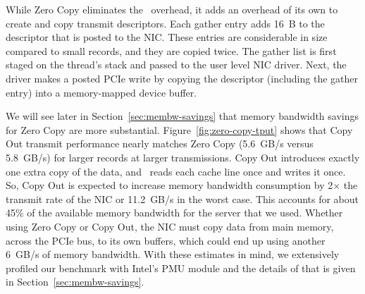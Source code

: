 While Zero Copy eliminates the \memcpy ~overhead, it adds an overhead of its own to create and copy transmit descriptors.
Each gather entry adds 16~B to the descriptor that is posted to the NIC.
These entries are considerable in size compared to
small records, and they are copied twice. The gather list
is first staged on the thread's stack and passed to the user level NIC driver. Next,
the driver makes a posted PCIe write by copying the descriptor (including the
gather entry) into a memory-mapped device buffer.

We will see later in Section~\ref{sec:membw-savings} that memory bandwidth savings for Zero Copy are more substantial.
Figure~\ref{fig:zero-copy-tput} shows that Copy Out transmit performance nearly
matches Zero Copy (5.6~GB/s versus 5.8~GB/s) for larger records at larger transmissions. Copy Out introduces exactly one
extra copy of the data, and \memcpy~reads each cache line once and writes it
once. So, Copy Out is expected to increase memory bandwidth consumption
by 2$\times$ the transmit rate of the NIC or 11.2~GB/s in the worst case. This
accounts for about 45\% of the available memory bandwidth for the server that we used. Whether
using Zero Copy or Copy Out, the NIC must copy data from main memory, across the PCIe bus, to its own buffers, which
could end up using another 6~GB/s of memory bandwidth. With these estimates in mind, we extensively profiled
 our benchmark with Intel's PMU module and the details of that is given in Section~\ref{sec:membw-savings}.
\newline





